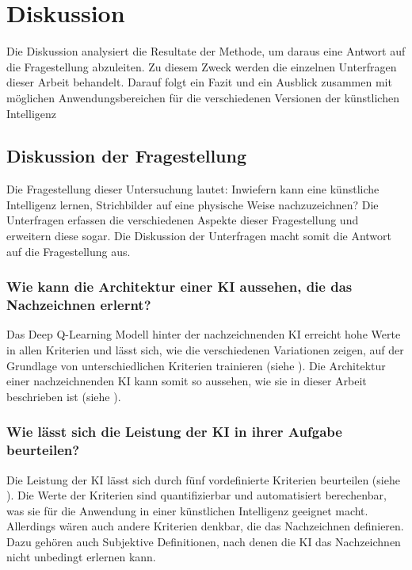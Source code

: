 \chapter{Diskussion}\label{chap:d} 
Die Diskussion analysiert die Resultate der Methode, um daraus eine Antwort auf
die Fragestellung abzuleiten. Zu diesem Zweck werden die einzelnen Unterfragen
dieser Arbeit behandelt. Darauf folgt ein Fazit und ein Ausblick zusammen mit
möglichen Anwendungsbereichen für die verschiedenen Versionen der künstlichen
Intelligenz

\section{Diskussion der Fragestellung}\label{chap:d_frage} 
Die Fragestellung dieser Untersuchung lautet: Inwiefern kann eine künstliche
Intelligenz lernen, Strichbilder auf eine physische Weise nachzuzeichnen? Die
Unterfragen erfassen die verschiedenen Aspekte dieser Fragestellung und
erweitern diese sogar. Die Diskussion der Unterfragen macht somit die Antwort
auf die Fragestellung aus.


\subsection{Wie kann die Architektur einer KI aussehen, die das Nachzeichnen
erlernt?}\label{subsub:d_frage_unter_1} Das Deep Q-Learning Modell hinter der
nachzeichnenden KI erreicht hohe Werte in allen Kriterien und lässt sich, wie
die verschiedenen Variationen zeigen, auf der Grundlage von unterschiedlichen Kriterien trainieren
(siehe ). Die Architektur einer nachzeichnenden
KI kann somit so aussehen, wie sie in dieser Arbeit beschrieben ist (siehe ).


\subsection{Wie lässt sich die Leistung der KI in ihrer Aufgabe
beurteilen?}\label{subsub:d_frage_unter_2} Die Leistung der KI lässt sich durch
fünf vordefinierte Kriterien beurteilen (siehe ). Die
Werte der Kriterien sind quantifizierbar und automatisiert berechenbar, was sie
für die Anwendung in einer künstlichen Intelligenz geeignet macht. Allerdings
wären auch andere Kriterien denkbar, die das Nachzeichnen definieren. Dazu
gehören auch Subjektive Definitionen, nach denen die KI das Nachzeichnen nicht
unbedingt erlernen kann. 

